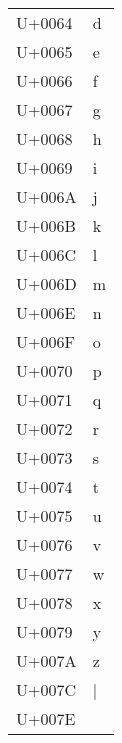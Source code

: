 \documentclass{article}
\begin{document}
\begin{longtable}{ll}
U+0064 & d \\
U+0065 & e \\
U+0066 & f \\
U+0067 & g \\
U+0068 & h \\
U+0069 & i \\
U+006A & j \\
U+006B & k \\
U+006C & l \\
U+006D & m \\
U+006E & n \\
U+006F & o \\
U+0070 & p \\
U+0071 & q \\
U+0072 & r \\
U+0073 & s \\
U+0074 & t \\
U+0075 & u \\
U+0076 & v \\
U+0077 & w \\
U+0078 & x \\
U+0079 & y \\
U+007A & z \\
U+007C & | \\
U+007E & ~ \\
\end{longtable}
\end{document}

